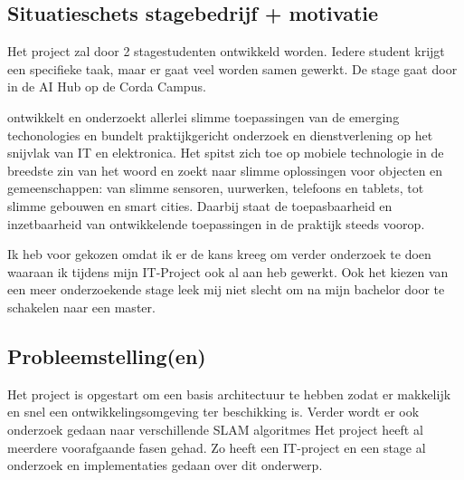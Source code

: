 \documentclass[a4paper]{article}
\begin{document}
    \subsection{Situatieschets stagebedrijf + motivatie}
      Het project zal door 2 stagestudenten ontwikkeld worden. Iedere student krijgt
      een specifieke taak, maar er gaat veel worden samen gewerkt. De stage
      gaat door in de AI Hub op de Corda Campus.\par
      \stagebedrijf{} ontwikkelt en onderzoekt allerlei slimme toepassingen van de
      emerging techonologies en bundelt praktijkgericht onderzoek en dienstverlening
      op het snijvlak van IT en elektronica. Het spitst zich toe op mobiele technologie
      in de breedste zin van het woord en zoekt naar slimme oplossingen voor
      objecten en gemeenschappen: van slimme sensoren, uurwerken, telefoons en tablets,
      tot slimme gebouwen en smart cities. Daarbij staat de toepasbaarheid en
      inzetbaarheid van ontwikkelende toepassingen in de praktijk steeds voorop.\par
      Ik heb voor \stagebedrijf{} gekozen omdat ik er de kans kreeg om verder onderzoek
      te doen waaraan ik tijdens mijn IT-Project ook al aan heb gewerkt. Ook het kiezen
      van een meer onderzoekende stage leek mij niet slecht om na mijn bachelor door te
      schakelen naar een master.

      \newpage

    \subsection{Probleemstelling(en)}
      Het project is opgestart om een basis architectuur te hebben zodat er makkelijk en
      snel een ontwikkelingsomgeving ter beschikking is. Verder wordt er ook onderzoek gedaan
      naar verschillende SLAM algoritmes
      Het project heeft al meerdere voorafgaande fasen gehad. Zo heeft een IT-project
      en een stage al onderzoek en implementaties gedaan over dit onderwerp.
\end{document}
